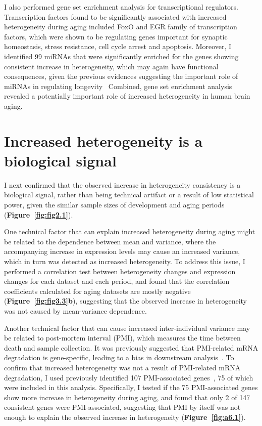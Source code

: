 I also performed gene set enrichment analysis for transcriptional regulators. 
Transcription factors found to be significantly associated with increased heterogeneity during aging included FoxO and EGR family of transcription factors, 
which were shown to be regulating genes important for synaptic homeostasis, stress resistance, cell cycle arrest and apoptosis.
Moreover, I identified 99 miRNAs that were significantly enriched for the genes showing consistent increase in heterogeneity, 
which may again have functional consequences, given the previous evidences suggesting the important role of miRNAs in regulating longevity~\cite{Vikos2012, Shen2012, Liu2012}
Combined, gene set enrichment analysis revealed a potentially important role of increased heterogeneity in human brain aging.

\section{Increased heterogeneity is a biological signal}
I next confirmed that the observed increase in heterogeneity consistency is a biological signal, rather than being technical artifact or a result of low statistical power, 
given the similar sample sizes of development and aging periods (\textbf{Figure~\ref{fig:fig2.1}}).

One technical factor that can explain increased heterogeneity during aging might be related to the dependence between mean and variance, 
where the accompanying increase in expression levels may cause an increased variance, which in turn was detected as increased heterogeneity.
To address this issue, I performed a correlation test between heterogeneity changes and expression changes for each dataset and each period, 
and found that the correlation coefficients calculated for aging datasets are mostly negative (\textbf{Figure~\ref{fig:fig3.3}b}), 
suggesting that the observed increase in heterogeneity was not caused by mean-variance dependence.

Another technical factor that can cause increased inter-individual variance may be related to post-mortem interval (PMI), 
which measures the time between death and sample collection.
It was previously suggested that PMI-related mRNA degradation is gene-specific, leading to a bias in downstream analysis~\cite{Zhu2017}.
To confirm that increased heterogeneity was not a result of PMI-related mRNA degradation,
I used previously identified 107 PMI-associated genes~\cite{Zhu2017}, 75 of which were included in this analysis.
Specifically, I tested if the 75 PMI-associated genes show more increase in heterogeneity during aging,
and found that only 2 of 147 consistent genes were PMI-associated, 
suggesting that PMI by itself was not enough to explain the observed increase in heterogeneity (\textbf{Figure~\ref{fig:a6.1}}).

